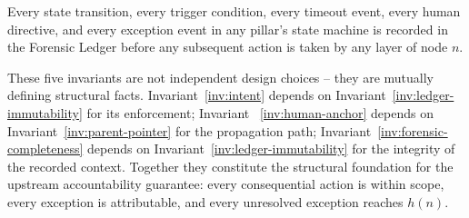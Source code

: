 \begin{invariant}\label{inv:forensic-completeness}
Every state transition, every trigger condition, every timeout event, every
human directive, and every exception event in any pillar's state machine is
recorded in the Forensic Ledger before any subsequent action is taken by any
layer of node $n$.
\end{invariant}

These five invariants are not independent design choices -- they are mutually
defining structural facts.  Invariant~\ref{inv:intent} depends on
Invariant~\ref{inv:ledger-immutability} for its enforcement; Invariant
~\ref{inv:human-anchor} depends on Invariant~\ref{inv:parent-pointer} for the
propagation path; Invariant~\ref{inv:forensic-completeness} depends on
Invariant~\ref{inv:ledger-immutability} for the integrity of the recorded
context.  Together they constitute the structural foundation for the upstream
accountability guarantee: every consequential action is within scope, every
exception is attributable, and every unresolved exception reaches $h(n)$.
